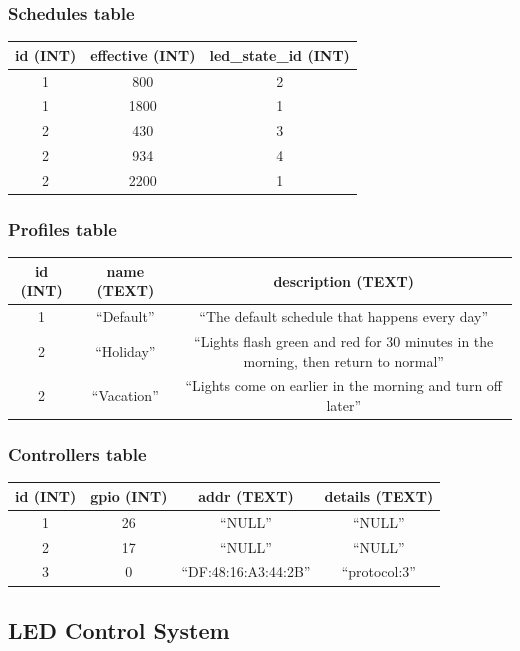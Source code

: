 \documentclass[onecolumn, draftclsnofoot,10pt, compsoc]{IEEEtran}
\begin{document}
			\subsubsection{Schedules table}
				\begin{tabular}{ |c|c|c| }
					\hline
					id (INT) & effective (INT) & led\_state\_id (INT) \\
					\hline
					1 & 800 & 2 \\
					1 & 1800 & 1 \\
					2 & 430 & 3 \\
					2 & 934 & 4 \\
					2 & 2200 & 1 \\
					\hline
				\end{tabular}

			\subsubsection{Profiles table}
				\begin{tabular}{ |c|c|c| }
					\hline
					id (INT) & name (TEXT) & description (TEXT) \\
					\hline
					1 & ``Default'' & ``The default schedule that happens every day'' \\
					2 & ``Holiday'' & ``Lights flash green and red for 30 minutes in the morning, then return to normal'' \\
					2 & ``Vacation'' & ``Lights come on earlier in the morning and turn off later'' \\
					\hline
				\end{tabular}

			\subsubsection{Controllers table}
				\begin{tabular}{ |c|c|c|c| }
					\hline
					id (INT) & gpio (INT) & addr (TEXT) & details (TEXT) \\
					\hline
					1 & 26 & ``NULL'' & ``NULL'' \\
					2 & 17 & ``NULL'' & ``NULL'' \\
					3 & 0 & ``DF:48:16:A3:44:2B'' & ``protocol:3'' \\
					\hline
				\end{tabular}


		\subsection{LED Control System}
\end{document}
